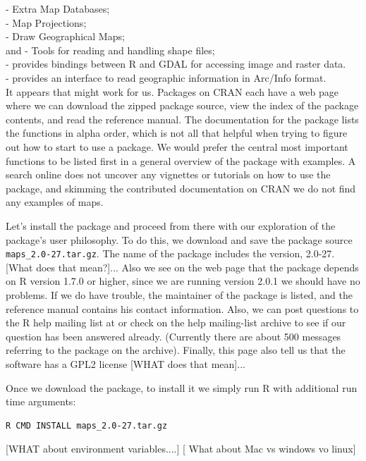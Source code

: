 \noindent 
{} - Extra Map Databases;\\
 - Map Projections;\\
 - Draw Geographical Maps;\\
 and  - Tools for reading and handling shape files;\\
 - provides bindings between R and GDAL for accessing
image and raster data.\\
 - provides an interface to read geographic information in
Arc/Info format.\\


It appears that  might work for us.
Packages on CRAN each have a web page where we can download the zipped package
source, view the index of the package contents, and read the reference
manual.
The documentation for the  package lists the functions in alpha order,
which is not all that helpful when trying to figure out how to start
to use a package.  We would prefer the central most important functions 
to be listed first in a general overview of the package with examples.
A search online does not uncover any vignettes or  tutorials on how to use the
 package, and skimming the contributed documentation on CRAN
we do not find any examples of maps.

Let's install the package and proceed from there  with our exploration of the
package's user philosophy.
To do this, we download and save the package source 
\verb+maps_2.0-27.tar.gz+.
The name of the package includes the version, 2.0-27.
[What does that mean?]...
Also we see on the web page that the package depends on
R version 1.7.0 or higher, since we are running version 2.0.1 
we should have no problems.
If we do have trouble, the maintainer of the package is
listed, and the reference manual contains his contact information.
Also, we can post questions to the R help mailing list 
at  or
check on the help mailing-list archive to see if our question has 
been answered already. 
(Currently there are about 500 messages referring to the 
 package on the archive).
Finally, this page also tell us that the software has a GPL2 license
[WHAT does that mean]...

Once we download the package, to install it we simply run 
R with additional run time arguments:
\begin{verbatim}
R CMD INSTALL maps_2.0-27.tar.gz
\end{verbatim}
[WHAT about environment variables....]
[ What about Mac vs windows vo linux]

